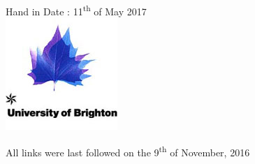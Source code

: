 \begin{titlepage}

{\large Hand in Date : 11\textsuperscript{th} of May 2017}\\[2cm] %


\includegraphics[scale=0.60]{Images/BrightonLogo.jpg}\\[1cm] %




\vfill %

\end{titlepage}

\tableofcontents
\pagebreak












\pagebreak
\printbibliography

All links were last followed on the 9\textsuperscript{th} of November, 2016


